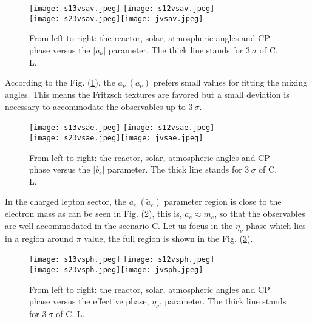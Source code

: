 \documentclass[aps,prd,groupaddress,floatfix,tighten,nofootinbib,showpacs,amsfonts,superscriptaddress]{revtex4-2}
\begin{document}
\begin{figure}[h!]\centering
	\texttt{[image: s13vsav.jpeg]}
	\hspace{1mm}\texttt{[image: s12vsav.jpeg]}\\
	\texttt{[image: s23vsav.jpeg]}\hspace{1mm}\texttt{[image: jvsav.jpeg]}
	\caption{From left to right: the reactor, solar, atmospheric angles and CP phase versus the $\vert a_{\nu}\vert$ parameter. The thick line stands for $3~\sigma$ of C. L.}\label{f2}
\end{figure}

According to the Fig. (\ref{f2}), the $a_{\nu}~( \tilde{a}_{\nu})$ prefers small values for fitting the mixing angles. This means the Fritzsch textures are favored but a small deviation is necessary to accommodate the observables up to $3~\sigma$. 




\begin{figure}[h!]\centering
	\texttt{[image: s13vsae.jpeg]}
	\hspace{1mm}\texttt{[image: s12vsae.jpeg]}\\
	\texttt{[image: s23vsae.jpeg]}\hspace{1mm}\texttt{[image: jvsae.jpeg]}
	\caption{From left to right: the reactor, solar, atmospheric angles and CP phase versus the $\vert b_{e}\vert$ parameter. The thick line stands for $3~\sigma$ of C. L.}\label{f3}
\end{figure}

In the charged lepton sector, the $a_{e}~(\tilde{a}_{e})$
parameter region is close to the electron mass as can be seen in Fig. (\ref{f3}), this is, $a_{e}\approx m_{e}$, so that the observables are well accommodated in the scenario C. Let us focus in the $\eta_{\nu}$ phase which lies in a region around $\pi$ value, the full region is shown in the Fig. (\ref{f4}).

\begin{figure}[h!]\centering
	\texttt{[image: s13vsph.jpeg]}
	\hspace{1mm}\texttt{[image: s12vsph.jpeg]}\\
	\texttt{[image: s23vsph.jpeg]}\hspace{1mm}\texttt{[image: jvsph.jpeg]}
	\caption{From left to right: the reactor, solar, atmospheric angles and CP phase versus the effective phase, $\eta_{\nu}$, parameter. The thick line stands for $3~\sigma$ of C. L.}\label{f4}
\end{figure}
\end{document}
